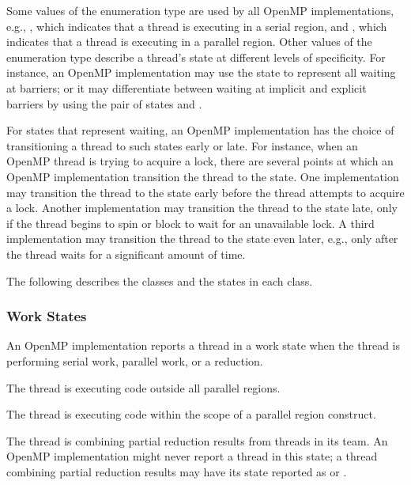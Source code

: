 Some values of the enumeration type  are used by all 
OpenMP implementations, 
e.g., , 
which indicates that a thread is executing in a serial region, and  
, 
which indicates that a thread is executing in a parallel region.
Other values of the enumeration type describe a thread's state at 
different levels of specificity. 
For instance, an OpenMP implementation may use 
the state   to represent all 
waiting at barriers; or it may differentiate between waiting at 
implicit and explicit barriers by using the pair of states
 and 
. 

For states that represent waiting, an OpenMP implementation has the 
choice of transitioning a thread to such states early or late.
For instance, when an OpenMP thread is trying to acquire a lock,
there are several points at which an OpenMP implementation
transition the thread to the  state.
One implementation may transition the thread to the state 
early before the thread attempts to acquire a
lock. Another implementation may transition the thread to the state 
late, only if the thread begins to spin or
block to wait for an unavailable lock. A third implementation
may transition the thread to the state even later, e.g., only
after the thread waits for a significant amount of time. 

The following describes the classes and the states in each class.
\subsubsection{Work States}
An OpenMP implementation reports a thread in a work state 
when the thread is performing serial work, parallel work, or a reduction.

\begin{description}

\item {} 

  The thread is executing code outside all parallel regions. 

\item {} 

  The thread is executing code within the scope of a parallel region construct.

\sloppy
\item {} 
 
  The thread is combining partial reduction results from threads in its team. 
  An OpenMP implementation  
  might never report a thread in this state; a thread
  combining partial reduction results may have its state reported as
   or .

\end{description}



